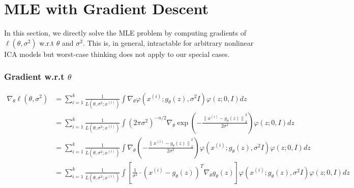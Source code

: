 \section{MLE with Gradient Descent}
In this section, we directly solve the MLE problem by computing gradients of $\ell(\theta, \sigma^{2})$ w.r.t $\theta$ and $\sigma^{2}$. This is, in general, intractable for arbitrary nonlinear ICA models but worst-case thinking does not apply to our special cases.

\subsubsection*{Gradient w.r.t $\theta$}
\begin{equation*}
\begin{aligned}
\nabla_{\theta} \ell(\theta, \sigma^{2}) &= \sum_{i=1}^{k} \frac{1}{L \left(\theta, \sigma^{2}; x^{(i)} \right)} \int \nabla_{\theta} \varphi\left(x^{(i)} ; g_{\theta}(z), \sigma^{2} I\right) \varphi(z ; 0, I) dz \\
&= \sum_{i=1}^{k} \frac{1}{L \left(\theta, \sigma^{2}; x^{(i)} \right)} \int \left(2\pi\sigma^{2}\right)^{-n/2} \nabla_{\theta} \exp \left(-\frac{{\lVert x^{(i)} - g_{\theta}(z) \rVert}_{2}^{2}}{2\sigma^{2}}\right) \varphi(z ; 0, I) dz \\
&= \sum_{i=1}^{k} \frac{1}{L \left(\theta, \sigma^{2}; x^{(i)} \right)} \int \nabla_{\theta} \left(-\frac{{\lVert x^{(i)} - g_{\theta}(z) \rVert}_{2}^{2}}{2\sigma^{2}}\right) \varphi\left(x^{(i)} ; g_{\theta}(z), \sigma^{2} I\right) \varphi(z ; 0, I) dz \\
&= \sum_{i=1}^{k} \frac{1}{L \left(\theta, \sigma^{2}; x^{(i)} \right)} \int \left[\frac{1}{\sigma^{2}} \cdot{\left(x^{(i)} - g_{\theta}(z)\right)^{T} \nabla_{\theta} g_{\theta}(z)}\right] \varphi\left(x^{(i)} ; g_{\theta}(z), \sigma^{2} I\right) \varphi(z ; 0, I) dz \\
\end{aligned}
\end{equation*}

